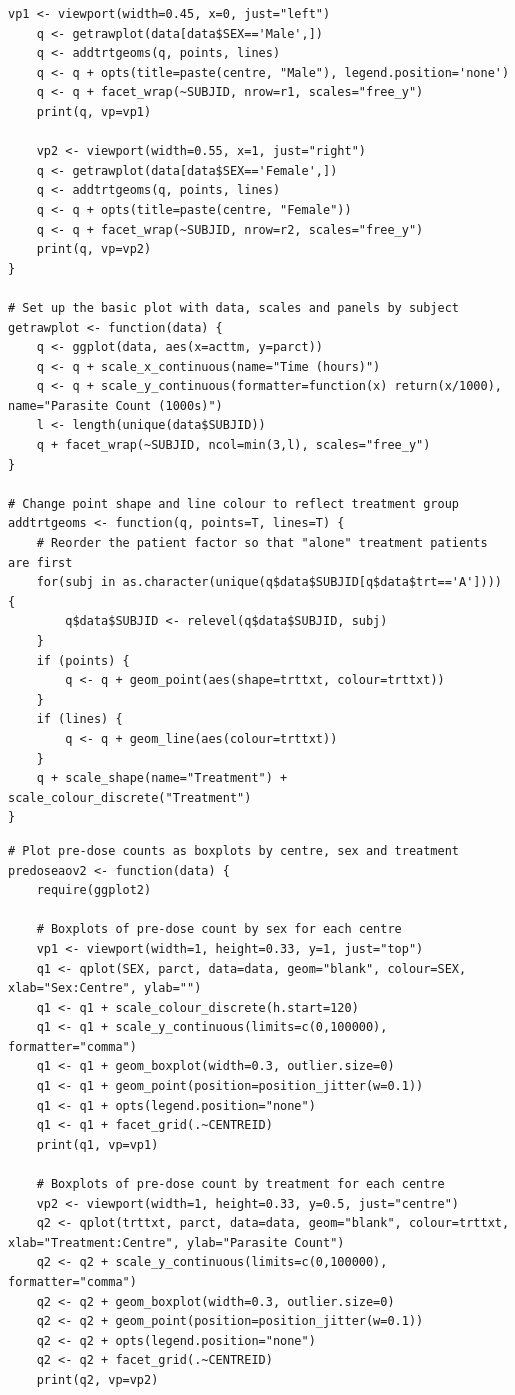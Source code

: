 \begin{singlespace}
\begin{lstlisting}[caption=Plot raw count data for male and female subjects side-by-side,label=R:rawggplot]
	vp1 <- viewport(width=0.45, x=0, just="left")
	q <- getrawplot(data[data$SEX=='Male',])
	q <- addtrtgeoms(q, points, lines)
	q <- q + opts(title=paste(centre, "Male"), legend.position='none')
	q <- q + facet_wrap(~SUBJID, nrow=r1, scales="free_y")
	print(q, vp=vp1)

	vp2 <- viewport(width=0.55, x=1, just="right")
	q <- getrawplot(data[data$SEX=='Female',])
	q <- addtrtgeoms(q, points, lines)
	q <- q + opts(title=paste(centre, "Female"))
	q <- q + facet_wrap(~SUBJID, nrow=r2, scales="free_y")
	print(q, vp=vp2)
}

# Set up the basic plot with data, scales and panels by subject
getrawplot <- function(data) {
	q <- ggplot(data, aes(x=acttm, y=parct))
	q <- q + scale_x_continuous(name="Time (hours)")
	q <- q + scale_y_continuous(formatter=function(x) return(x/1000), name="Parasite Count (1000s)")
	l <- length(unique(data$SUBJID))
	q + facet_wrap(~SUBJID, ncol=min(3,l), scales="free_y")
}

# Change point shape and line colour to reflect treatment group
addtrtgeoms <- function(q, points=T, lines=T) {
	# Reorder the patient factor so that "alone" treatment patients are first
	for(subj in as.character(unique(q$data$SUBJID[q$data$trt=='A']))) {
		q$data$SUBJID <- relevel(q$data$SUBJID, subj)
	}
	if (points) {
		q <- q + geom_point(aes(shape=trttxt, colour=trttxt))
	}
	if (lines) {
		q <- q + geom_line(aes(colour=trttxt))
	}
	q + scale_shape(name="Treatment") + scale_colour_discrete("Treatment")
}
\end{lstlisting}

\begin{lstlisting}[caption=Boxplots of pre-dose count by sex\, centre and treatment,label=R:predoseaov]
# Plot pre-dose counts as boxplots by centre, sex and treatment
predoseaov2 <- function(data) {
	require(ggplot2)

	# Boxplots of pre-dose count by sex for each centre
	vp1 <- viewport(width=1, height=0.33, y=1, just="top")
	q1 <- qplot(SEX, parct, data=data, geom="blank", colour=SEX, xlab="Sex:Centre", ylab="")
	q1 <- q1 + scale_colour_discrete(h.start=120)
	q1 <- q1 + scale_y_continuous(limits=c(0,100000), formatter="comma")
	q1 <- q1 + geom_boxplot(width=0.3, outlier.size=0)
	q1 <- q1 + geom_point(position=position_jitter(w=0.1))
	q1 <- q1 + opts(legend.position="none")
	q1 <- q1 + facet_grid(.~CENTREID)
	print(q1, vp=vp1)

	# Boxplots of pre-dose count by treatment for each centre
	vp2 <- viewport(width=1, height=0.33, y=0.5, just="centre")
	q2 <- qplot(trttxt, parct, data=data, geom="blank", colour=trttxt, xlab="Treatment:Centre", ylab="Parasite Count")
	q2 <- q2 + scale_y_continuous(limits=c(0,100000), formatter="comma")
	q2 <- q2 + geom_boxplot(width=0.3, outlier.size=0)
	q2 <- q2 + geom_point(position=position_jitter(w=0.1))
	q2 <- q2 + opts(legend.position="none")
	q2 <- q2 + facet_grid(.~CENTREID)
	print(q2, vp=vp2)


\end{lstlisting}
\end{singlespace}
